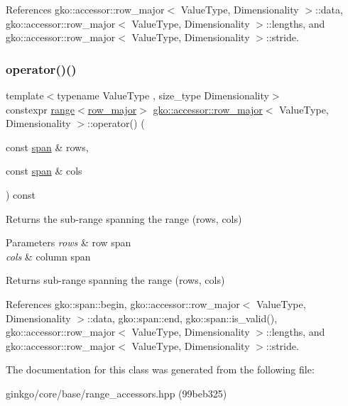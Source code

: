 References gko\+::accessor\+::row\+\_\+major$<$ Value\+Type, Dimensionality $>$\+::data, gko\+::accessor\+::row\+\_\+major$<$ Value\+Type, Dimensionality $>$\+::lengths, and gko\+::accessor\+::row\+\_\+major$<$ Value\+Type, Dimensionality $>$\+::stride.

\mbox{\label{classgko_1_1accessor_1_1row__major_ad1a38f9d96e849ae10de733809a3494d}} 
\subsubsection{\texorpdfstring{operator()()}{operator()()}\hspace{0.1cm}{\footnotesize\ttfamily [2/2]}}
{\footnotesize\ttfamily template$<$typename Value\+Type , size\+\_\+type Dimensionality$>$ \\
constexpr \hyperlink{classgko_1_1range}{range}$<$\hyperlink{classgko_1_1accessor_1_1row__major}{row\+\_\+major}$>$ \hyperlink{classgko_1_1accessor_1_1row__major}{gko\+::accessor\+::row\+\_\+major}$<$ Value\+Type, Dimensionality $>$\+::operator() (\begin{DoxyParamCaption}\item[{const \hyperlink{structgko_1_1span}{span} \&}]{rows,  }\item[{const \hyperlink{structgko_1_1span}{span} \&}]{cols }\end{DoxyParamCaption}) const}



Returns the sub-\/range spanning the range (rows, cols) 


\begin{DoxyParams}{Parameters}
{\em rows} & row span \\
\hline
{\em cols} & column span\\
\hline
\end{DoxyParams}
\begin{DoxyReturn}{Returns}
sub-\/range spanning the range (rows, cols) 
\end{DoxyReturn}


References gko\+::span\+::begin, gko\+::accessor\+::row\+\_\+major$<$ Value\+Type, Dimensionality $>$\+::data, gko\+::span\+::end, gko\+::span\+::is\+\_\+valid(), gko\+::accessor\+::row\+\_\+major$<$ Value\+Type, Dimensionality $>$\+::lengths, and gko\+::accessor\+::row\+\_\+major$<$ Value\+Type, Dimensionality $>$\+::stride.



The documentation for this class was generated from the following file\+:\begin{DoxyCompactItemize}
\item 
ginkgo/core/base/range\+\_\+accessors.\+hpp (99beb325)\end{DoxyCompactItemize}
